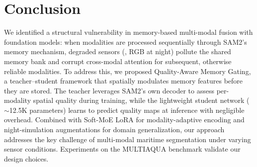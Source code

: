 \section{Conclusion}
\label{sec:conclusion}

We identified a structural vulnerability in memory-based multi-modal fusion with foundation models: when modalities are processed sequentially through SAM2's memory mechanism, degraded sensors (\eg, RGB at night) pollute the shared memory bank and corrupt cross-modal attention for subsequent, otherwise reliable modalities.
To address this, we proposed Quality-Aware Memory Gating, a teacher--student framework that spatially modulates memory features before they are stored.
The teacher leverages SAM2's own decoder to assess per-modality spatial quality during training, while the lightweight student network (${\sim}$12.5K parameters) learns to predict quality maps at inference with negligible overhead.
Combined with Soft-MoE LoRA for modality-adaptive encoding and night-simulation augmentations for domain generalization, our approach addresses the key challenge of multi-modal maritime segmentation under varying sensor conditions.
Experiments on the MULTIAQUA benchmark validate our design choices.
